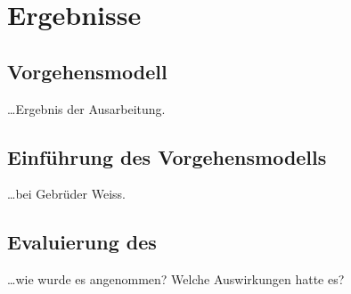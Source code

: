 \chapter{Ergebnisse}

\section{Vorgehensmodell}

\ldots Ergebnis der Ausarbeitung.

\section{Einführung des Vorgehensmodells}

\ldots bei Gebrüder Weiss.

\section{Evaluierung des  }

\ldots wie wurde es angenommen? Welche Auswirkungen hatte es?
